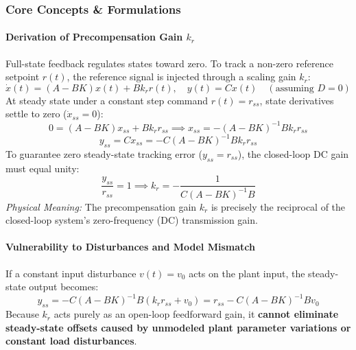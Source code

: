 \documentclass[12pt,onecolumn,twoside ]{article}
\begin{document}
	\subsubsection{Core Concepts \& Formulations}
	\paragraph{Derivation of Precompensation Gain $k_r$}
	Full-state feedback regulates states toward zero. To track a non-zero reference setpoint $r(t)$, the reference signal is injected through a scaling gain $k_r$: \[
	\dot{x}(t) = (A - BK)x(t) + B k_r r(t), \quad y(t) = Cx(t) \quad (\text{assuming } D = 0)
	\]
	At steady state under a constant step command $r(t) = r_{ss}$, state derivatives settle to zero ($\dot{x}_{ss} = 0$): \[
	0 = (A - BK)x_{ss} + B k_r r_{ss} \implies x_{ss} = -(A - BK)^{-1} B k_r r_{ss}
	\] \[
	y_{ss} = C x_{ss} = -C (A - BK)^{-1} B k_r r_{ss}
	\]
	To guarantee zero steady-state tracking error ($y_{ss} = r_{ss}$), the closed-loop DC gain must equal unity: \[
	\frac{y_{ss}}{r_{ss}} = 1 \implies k_r = -\frac{1}{C(A - BK)^{-1}B}
	\] \textit{Physical Meaning:} The precompensation gain $k_r$ is precisely the reciprocal of the closed-loop system's zero-frequency (DC) transmission gain.
	\paragraph{Vulnerability to Disturbances and Model Mismatch}
	If a constant input disturbance $v(t) = v_0$ acts on the plant input, the steady-state output becomes: \[
	y_{ss} = -C(A - BK)^{-1}B (k_r r_{ss} + v_0) = r_{ss} - C(A - BK)^{-1}B v_0
	\] Because $k_r$ acts purely as an open-loop feedforward gain, it \textbf{cannot eliminate steady-state offsets caused by unmodeled plant parameter variations or constant load disturbances}.
\end{document}
